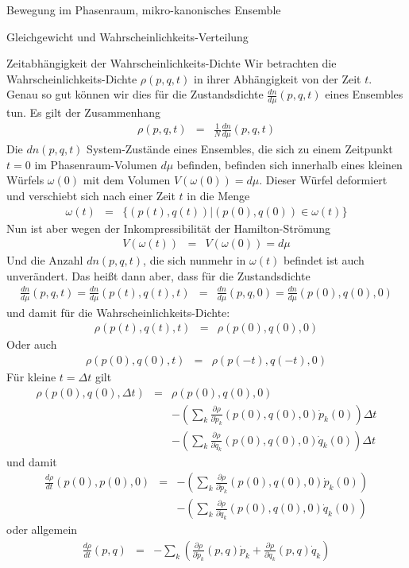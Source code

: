 \begin{chapter}{\titlestr}
\begin{section}{Bewegung im Phasenraum, mikro-kanonisches Ensemble}
\begin{subsection}{Gleichgewicht und Wahrscheinlichkeits-Verteilung}
\begin{subsubsection}{Zeitabhängigkeit der Wahrscheinlichkeits-Dichte}
Wir betrachten die Wahrscheinlichkeits-Dichte $\rho(p,q,t)$ in ihrer Abhängigkeit von der Zeit $t$.
Genau so gut können wir dies für die Zustandsdichte $\frac{dn}{d\mu}(p,q,t)$ eines Ensembles tun. Es gilt der Zusammenhang
\begin{eqnarray*}
\rho(p,q,t) &=& \frac{1}{N}\frac{dn}{d\mu}(p,q,t)
\end{eqnarray*}
Die $dn(p,q,t)$ System-Zustände eines Ensembles, die sich zu einem Zeitpunkt $t=0$ im Phasenraum-Volumen $d\mu$ befinden, 
befinden sich innerhalb eines kleinen Würfels $\omega(0)$ mit dem Volumen $V(\omega(0))=d\mu$. Dieser Würfel deformiert und verschiebt sich nach einer Zeit $t$ in die Menge
\begin{eqnarray*}
\omega ( t ) &=& \{ (p(t),q(t)) | (p(0),q(0))\in \omega ( t )\}
\end{eqnarray*}
Nun ist aber wegen der Inkompressibilität der Hamilton-Strömung
\begin{eqnarray*}
V(\omega ( t )) &=& V(\omega (0))=d\mu
\end{eqnarray*}
Und die Anzahl $dn(p,q,t)$, die sich nunmehr in $\omega(t)$ befindet ist auch unverändert. Das heißt dann aber, dass für die Zustandsdichte
\begin{eqnarray*}
\frac{dn}{d\mu}(p,q,t) = \frac{dn}{d\mu}(p(t),q(t),t) &=& \frac{dn}{d\mu}(p,q,0)=\frac{dn}{d\mu}(p(0),q(0),0)
\end{eqnarray*}
und damit für die Wahrscheinlichkeits-Dichte:
\begin{eqnarray*}
\rho(p(t),q(t),t) &=& \rho(p(0),q(0),0)
\end{eqnarray*}
Oder auch
\begin{eqnarray*}
\rho(p(0),q(0),t) &=& \rho(p(-t),q(-t),0)
\end{eqnarray*}
Für kleine $t=\Delta t$ gilt
\begin{eqnarray*}
\rho(p(0),q(0),\Delta t) &=& \rho(p(0),q(0),0)\\
&&-\left(\sum_k\frac{\partial \rho}{\partial \dot{p}_k}(p(0),q(0),0)\dot{p}_k(0)
\right)\Delta t\\
&&-\left(\sum_k\frac{\partial \rho}{\partial \dot{q}_k}(p(0),q(0),0)\dot{q}_k(0)
\right)\Delta t
\end{eqnarray*}
und damit
\begin{eqnarray*}
\frac{d\rho}{dt}(p(0),p(0),0) &=& -\left(\sum_k\frac{\partial \rho}{\partial \dot{p}_k}(p(0),q(0),0)\dot{p}_k(0)
\right)\\
&& -\left(\sum_k\frac{\partial \rho}{\partial \dot{q}_k}(p(0),q(0),0)\dot{q}_k(0)
\right)
\end{eqnarray*}
oder allgemein
\begin{eqnarray*}
\frac{d\rho}{dt}(p,q) &=& -\sum_k\left(\frac{\partial \rho}{\partial \dot{p}_k}(p,q)\dot{p}_k
+\frac{\partial \rho}{\partial \dot{q}_k}(p,q)\dot{q}_k
\right)
\end{eqnarray*}
\end{subsubsection}


\end{subsection}
\end{section}
\end{chapter}
